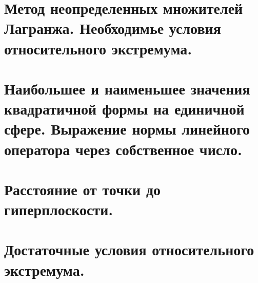 \documentclass[12pt, a4paper]{article}
\begin{document}
\section{Метод неопределенных множителей Лагранжа. Необходимье условия относительного экстремума.}
\section{Наибольшее и наименьшее значения квадратичной формы на единичной сфере. Выражение нормы линейного оператора через собственное число.}
\section{Расстояние от точки до гиперплоскости.}
\section{Достаточные условия относительного экстремума.}
\end{document}
